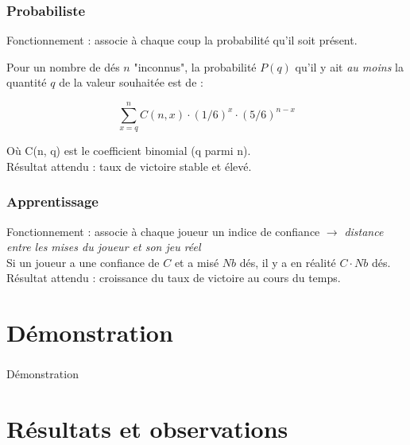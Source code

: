 \documentclass{beamer}
\begin{document}
\begin{frame}
  \frametitle{Probabiliste}

  Fonctionnement : associe à chaque coup la probabilité qu'il soit présent.

  Pour un nombre de dés $n$ "inconnus", la probabilité $P(q)$ qu'il y ait
  \emph{au moins} la quantité $q$ de la valeur souhaitée est de :

  $$
  \sum\limits_{x=q}^n C(n, x) \cdot (1/6)^x \cdot (5/6)^{n-x}
  $$

  Où C(n, q) est le coefficient binomial (q parmi n).
  \\[1cm]

  Résultat attendu : taux de victoire stable et élevé.
\end{frame}

\begin{frame}
  \frametitle{Apprentissage}

  Fonctionnement : associe à chaque joueur un indice de confiance $\to$
  \textit{distance entre les mises du joueur et son jeu réel}
  \\[1cm]
  Si un joueur a une confiance de $C$ et a misé $Nb$ dés, il y a en réalité $C
  \cdot Nb$ dés.
  \\[1cm]
  Résultat attendu : croissance du taux de victoire au cours du temps.
\end{frame}

\section{Démonstration}
\begin{frame}
  \frametitle{}

  \begin{center}
    Démonstration
  \end{center}
\end{frame}

\section{Résultats et observations}
\end{document}
